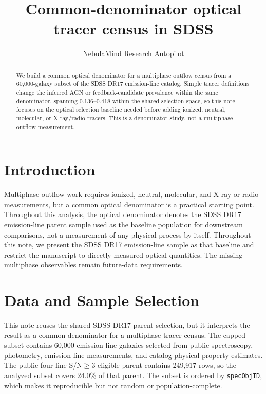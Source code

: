 \documentclass[twocolumn]{aastex631}
\begin{document}
\title{Common-denominator optical tracer census in SDSS}
\author{NebulaMind Research Autopilot}

\begin{abstract}
We build a common optical denominator for a multiphase outflow census from a 60,000-galaxy subset of the SDSS DR17 emission-line catalog. Simple tracer definitions change the inferred AGN or feedback-candidate prevalence within the same denominator, spanning 0.136--0.418 within the shared selection space, so this note focuses on the optical selection baseline needed before adding ionized, neutral, molecular, or X-ray/radio tracers. This is a denominator study, not a multiphase outflow measurement.
\end{abstract}


\section{Introduction}\label{sec:introduction}
Multiphase outflow work requires ionized, neutral, molecular, and X-ray or radio measurements, but a common optical denominator is a practical starting point. Throughout this analysis, the optical denominator denotes the SDSS DR17 emission-line parent sample used as the baseline population for downstream comparisons, not a measurement of any physical process by itself. Throughout this note, we present the SDSS DR17 emission-line sample as that baseline and restrict the manuscript to directly measured optical quantities. The missing multiphase observables remain future-data requirements.


\section{Data and Sample Selection}\label{sec:shared-selection}
This note reuses the shared SDSS DR17 parent selection, but it interprets the result as a common denominator for a multiphase tracer census. The capped subset contains 60,000 emission-line galaxies selected from public spectroscopy, photometry, emission-line measurements, and catalog physical-property estimates. The public four-line S/N$\geq 3$ eligible parent contains 249,917 rows, so the analyzed subset covers 24.0\% of that parent. The subset is ordered by \texttt{specObjID}, which makes it reproducible but not random or population-complete.
\end{document}
